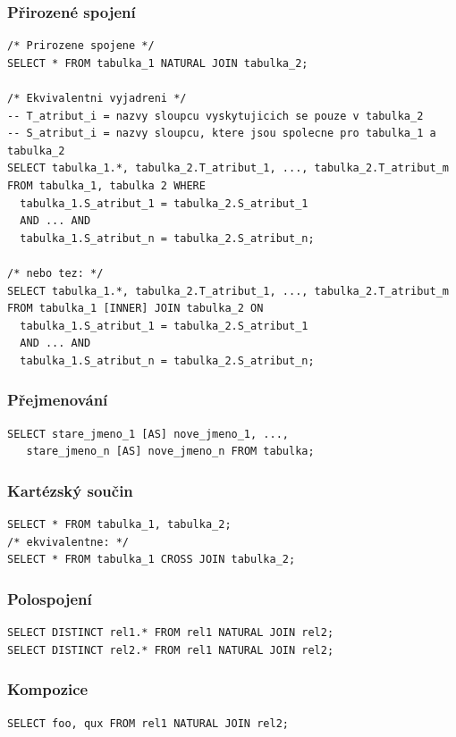 \documentclass[10pt,a4paper]{article}
\begin{document}
\subsubsection{Přirozené spojení}
\begin{lstlisting}
/* Prirozene spojene */
SELECT * FROM tabulka_1 NATURAL JOIN tabulka_2;
	
/* Ekvivalentni vyjadreni */
-- T_atribut_i = nazvy sloupcu vyskytujicich se pouze v tabulka_2
-- S_atribut_i = nazvy sloupcu, ktere jsou spolecne pro tabulka_1 a tabulka_2
SELECT tabulka_1.*, tabulka_2.T_atribut_1, ..., tabulka_2.T_atribut_m
FROM tabulka_1, tabulka 2 WHERE
  tabulka_1.S_atribut_1 = tabulka_2.S_atribut_1
  AND ... AND
  tabulka_1.S_atribut_n = tabulka_2.S_atribut_n;
	  
/* nebo tez: */
SELECT tabulka_1.*, tabulka_2.T_atribut_1, ..., tabulka_2.T_atribut_m
FROM tabulka_1 [INNER] JOIN tabulka_2 ON
  tabulka_1.S_atribut_1 = tabulka_2.S_atribut_1
  AND ... AND
  tabulka_1.S_atribut_n = tabulka_2.S_atribut_n;
\end{lstlisting}

\subsubsection{Přejmenování}
\begin{lstlisting}
SELECT stare_jmeno_1 [AS] nove_jmeno_1, ..., 
   stare_jmeno_n [AS] nove_jmeno_n FROM tabulka;
\end{lstlisting}

\subsubsection{Kartézský součin}
\begin{lstlisting}
SELECT * FROM tabulka_1, tabulka_2;
/* ekvivalentne: */
SELECT * FROM tabulka_1 CROSS JOIN tabulka_2;
\end{lstlisting}

\subsubsection{Polospojení}
\begin{lstlisting}
SELECT DISTINCT rel1.* FROM rel1 NATURAL JOIN rel2;
SELECT DISTINCT rel2.* FROM rel1 NATURAL JOIN rel2;
\end{lstlisting}

\subsubsection{Kompozice}
\begin{lstlisting}
SELECT foo, qux FROM rel1 NATURAL JOIN rel2;
\end{lstlisting}
\end{document}
